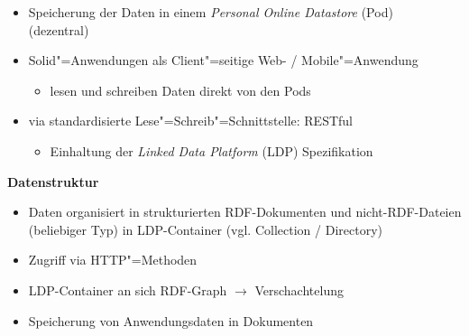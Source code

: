 \begin{itemize}
    \item Speicherung der Daten in einem \emph{Personal Online Datastore} (Pod)~\cite{sambraSolidPlatformDecentralized2016,mecklerWebLinkedData2023} (dezentral)
    \item Solid"=Anwendungen als Client"=seitige Web- / Mobile"=Anwendung~\cite{sambraSolidPlatformDecentralized2016}
    \begin{itemize}
        \item lesen und schreiben Daten direkt von den Pods
    \end{itemize}
    \item via standardisierte Lese"=Schreib"=Schnittstelle: RESTful~\cite{mecklerWebLinkedData2023,sambraSolidPlatformDecentralized2016}
    \begin{itemize}
        \item Einhaltung der \emph{Linked Data Platform} (LDP) Spezifikation~\cite{mecklerWebLinkedData2023,sambraSolidPlatformDecentralized2016}
    \end{itemize}
\end{itemize}

\vspace{1cm}

\textbf{Datenstruktur}
\begin{itemize}
    \item Daten organisiert in strukturierten RDF-Dokumenten und nicht-RDF-Dateien (beliebiger Typ) in LDP-Container (vgl. Collection / Directory)~\cite{mecklerWebLinkedData2023,sambraSolidPlatformDecentralized2016}
    \item Zugriff via HTTP"=Methoden~\cite{sambraSolidPlatformDecentralized2016}
    \item LDP-Container an sich RDF-Graph $\to$ Verschachtelung~\cite{mecklerWebLinkedData2023}
    \item Speicherung von Anwendungsdaten in Dokumenten~\cite{sambraSolidPlatformDecentralized2016}
\end{itemize}

\vspace{1cm}

